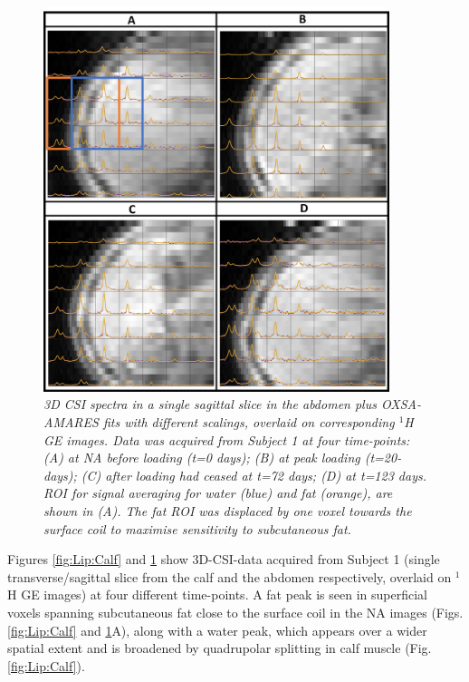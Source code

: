 \begin{figure}
    \centering
    \includegraphics[width=0.9\textwidth]{Figures/Lipid/Abdomen.png}
    \caption{\textit{3D \ac{CSI} spectra in a single sagittal slice in the abdomen plus OXSA-AMARES fits with different scalings, overlaid on corresponding $^1$H \ac{GE} images. Data was acquired from Subject 1 at four time-points: (A) at NA before loading (t=0 days); (B) at peak loading (t=20-days); (C) after loading had ceased at t=72 days; (D) at t=123 days. \ac{ROI} for signal averaging for water (blue) and fat (orange), are shown in (A). The fat \ac{ROI} was displaced by one voxel towards the surface coil to maximise sensitivity to subcutaneous fat.}}
    \label{fig:Lip:Abdomen}
\end{figure}

Figures \ref{fig:Lip:Calf} and \ref{fig:Lip:Abdomen} show 3D-\ac{CSI}-data acquired from Subject 1 (single transverse/sagittal slice from the calf and the abdomen respectively, overlaid on $^1$H GE images) at four different time-points. A fat peak is seen in superficial voxels spanning subcutaneous fat close to the surface coil in the \ac{NA} images (Figs. \ref{fig:Lip:Calf} and \ref{fig:Lip:Abdomen}A), along with a water peak, which appears over a wider spatial extent and is broadened by quadrupolar splitting in calf muscle (Fig. \ref{fig:Lip:Calf}). 

